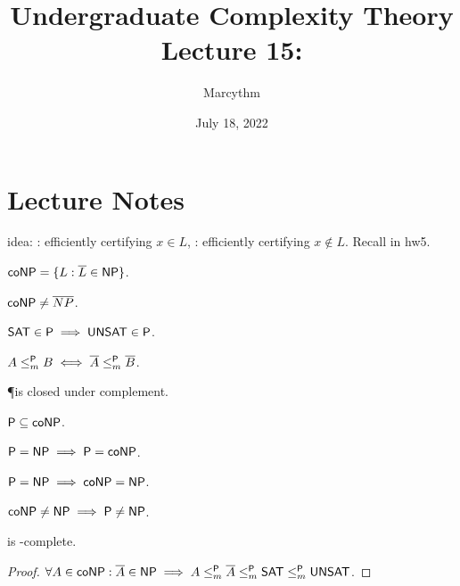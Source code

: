 \documentclass{article}
\title{Undergraduate Complexity Theory \\ Lecture 15: \coNP}
\author{Marcythm}
\date{July 18, 2022}
\begin{document}
\maketitle{}

\section{Lecture Notes}

idea: \NP: efficiently certifying \(x \in L\), \coNP: efficiently certifying \(x \notin L\). Recall  in hw5.

\begin{definition}
  \( \text{\sf coNP} = \lbrace L : \overline{L} \in \text{\sf NP}\rbrace \).
\end{definition}

\begin{remark}
  \( \text{\sf coNP} \neq \overline{NP} \).
\end{remark}

\begin{theorem}
  \( \text{\sf SAT} \in \text{\sf P} \implies \text{\sf UNSAT} \in \text{\sf P} \).
\end{theorem}

\begin{theorem}
  \( A \leq_m^\text{\sf P} B \iff \overline{A} \leq_m^\text{\sf P} \overline{B} \).
\end{theorem}

\begin{theorem}
  \P is closed under complement.
\end{theorem}

\begin{theorem}
  \( \text{\sf P} \subseteq \text{\sf coNP} \).
\end{theorem}

\begin{theorem}
  \( \text{\sf P} = \text{\sf NP} \implies \text{\sf P} = \text{\sf coNP} \).
\end{theorem}

\begin{corollary}
  \( \text{\sf P} = \text{\sf NP} \implies \text{\sf coNP} = \text{\sf NP} \).
\end{corollary}

\begin{corollary}
  \( \text{\sf coNP} \neq \text{\sf NP} \implies \text{\sf P} \neq \text{\sf NP} \).
\end{corollary}

\begin{theorem}
   is \coNP-complete.
\end{theorem}

\begin{proof}
  \( \forall A \in \text{\sf coNP}: \overline{A} \in \text{\sf NP} \implies A \leq_m^\text{\sf P} \overline{A} \leq_m^\text{\sf P} \text{\sf SAT} \leq_m^\text{\sf P} \text{\sf UNSAT} \).
\end{proof}
\end{document}
